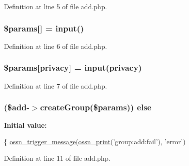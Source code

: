 Definition at line 5 of file add.\+php.

\subsubsection[{\texorpdfstring{\$params}{$params}}]{\setlength{\rightskip}{0pt plus 5cm}\$params\mbox{[}\textquotesingle{}\mbox{]} = {\bf input}(\textquotesingle{})}\hypertarget{components_2_ossn_groups_2actions_2group_2add_8php_aafea17cf6bee6d7d0438786e422c0ef3}{}\label{components_2_ossn_groups_2actions_2group_2add_8php_aafea17cf6bee6d7d0438786e422c0ef3}


Definition at line 6 of file add.\+php.

\subsubsection[{\texorpdfstring{\$params}{$params}}]{\setlength{\rightskip}{0pt plus 5cm}\$params\mbox{[}\textquotesingle{}privacy\textquotesingle{}\mbox{]} = {\bf input}(\textquotesingle{}privacy\textquotesingle{})}\hypertarget{components_2_ossn_groups_2actions_2group_2add_8php_af21dea2cca3a782b46ee6a9bb5cea4e7}{}\label{components_2_ossn_groups_2actions_2group_2add_8php_af21dea2cca3a782b46ee6a9bb5cea4e7}


Definition at line 7 of file add.\+php.

\subsubsection[{\texorpdfstring{else}{else}}]{ (\${\bf add}-\/$>$create\+Group(\$params)) else}\hypertarget{components_2_ossn_groups_2actions_2group_2add_8php_acb0306354a182376f95de74a57635f77}{}\label{components_2_ossn_groups_2actions_2group_2add_8php_acb0306354a182376f95de74a57635f77}
{\bfseries Initial value\+:}
\begin{DoxyCode}
\{
    \hyperlink{ossn_8lib_8system_8php_ab3f23f23f32f50c12e7aea0ffaccaac7}{ossn\_trigger\_message}(\hyperlink{ossn_8lib_8languages_8php_a2be5d1c4b695593a9b9067b96df2150a}{ossn\_print}(\textcolor{stringliteral}{'group:add:fail'}), \textcolor{stringliteral}{'error'})
\end{DoxyCode}


Definition at line 11 of file add.\+php.

